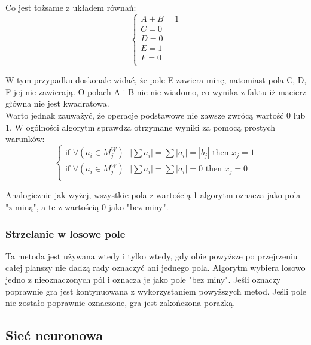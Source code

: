 \documentclass[letterpaper,12pt]{article}
\begin{document}
Co jest tożsame z układem równań:\\
$$
\begin{cases}
 A + B = 1 \\
 C = 0 \\
 D = 0 \\
 E = 1 \\
 F = 0 \\
\end{cases}
$$

W tym przypadku doskonale widać, że pole E zawiera minę, natomiast pola C, D, F jej nie zawierają. 
O polach A i B nic nie wiadomo, co wynika z faktu iż macierz główna nie jest kwadratowa. \\
Warto jednak zauważyć, że operacje podstawowe nie zawsze zwrócą wartość 0 lub 1. W ogólności
algorytm sprawdza otrzymane wyniki za pomocą prostych warunków: 
$$
\begin{cases}
 \text{if } \forall{(a_{i} \in M_{j}^W)} \text{ } |\sum{a_{i}}| = \sum{|a_{i}| = |b_{j}|}  \text{ then } x_{j}=1 \\
 \text{if } \forall{(a_{i} \in M_{j}^W)} \text{ } |\sum{a_{i}}| = \sum{|a_{i}|} = 0 \text{ then } x_{j}=0 \\
\end{cases}
$$

Analogicznie jak wyżej, wszystkie pola z wartością 1 algorytm oznacza jako pola "z miną", a te z wartością 0 jako "bez miny".

\subsubsection*{Strzelanie w losowe pole}
Ta metoda jest używana wtedy i tylko wtedy, gdy obie powyższe po przejrzeniu całej planszy
nie dadzą rady oznaczyć ani jednego pola. Algorytm wybiera losowo jedno z nieoznaczonych pól
i oznacza je jako pole "bez miny". Jeśli oznaczy poprawnie gra jest kontynuowana z wykorzystaniem
 powyższych metod. Jeśli pole nie zostało poprawnie oznaczone, gra jest zakończona porażką.

\subsection{Sieć neuronowa}
\end{document}
